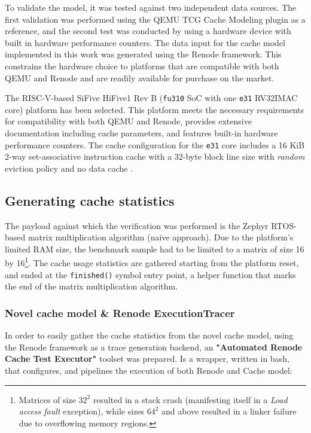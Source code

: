 To validate the model, it was tested against two independent data sources. The first validation was performed using the QEMU TCG Cache Modeling plugin as a reference, and the
second test was conducted by using a hardware device with built in hardware performance counters. The data input for the cache model implemented in this work was generated using
the Renode framework. This constrains the hardware choice to platforms that are compatible with both QEMU and Renode and are readily available for purchase on the market.

The RISC-V-based SiFive HiFive1 Rev B (\texttt{fu310} SoC with one \texttt{e31} RV32IMAC core) platform has been selected. This platform meets the necessary requirements for
compatibility with both QEMU and Renode, provides extensive documentation including cache parameters, and features built-in hardware performance counters.
The cache configuration for the \texttt{e31} core includes a 16 KiB 2-way set-associative instruction cache with a 32-byte block line size with \textit{random} eviction policy and
no data cache \cite{fe310docs}.

\subsection{Generating cache statistics}

The payload against which the verification was performed is the Zephyr RTOS-based matrix multiplication algorithm (naive approach). Due to the
platform's limited RAM size, the benchmark sample had to be limited to a matrix of size 16 by 16\footnote{Matrices of size $32^2$ resulted in a stack crash (manifesting itself in
a \textit{Load access fault} exception), while sizes $64^2$ and above resulted in a linker failure due to overflowing memory regions.}. The cache usage statistics are gathered
starting from the platform reset, and ended at the \texttt{finished()} symbol entry point, a helper function that marks the end of the matrix multiplication algorithm.

\subsubsection{Novel cache model \& Renode ExecutionTracer} %
In order to easily gather the cache statistics from the novel cache model, using the Renode framework as a trace generation backend, an \textbf{"Automated Renode Cache Test Executor"} %
toolset was prepared. Is a wrapper, written in bash, that configures, and pipelines the execution of both Renode and Cache model:


